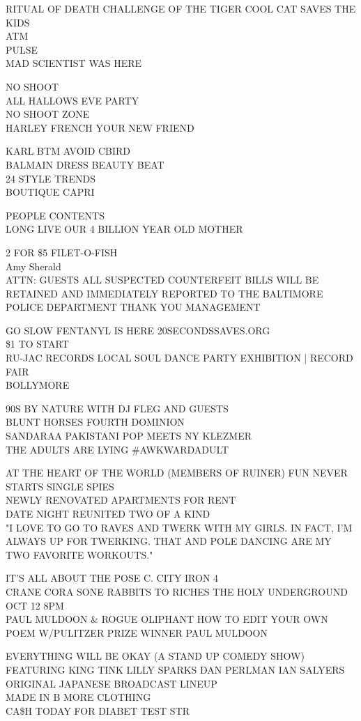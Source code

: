\documentclass[10pt,letterpaper]{article}
\begin{document}
RITUAL OF DEATH CHALLENGE OF THE TIGER COOL CAT SAVES THE KIDS\\
ATM\\
PULSE\\
MAD SCIENTIST WAS HERE

NO SHOOT\\
ALL HALLOWS EVE PARTY\\
NO SHOOT ZONE\\
HARLEY FRENCH YOUR NEW FRIEND

KARL BTM AVOID CBIRD\\
BALMAIN DRESS BEAUTY BEAT\\
24 STYLE TRENDS\\
BOUTIQUE CAPRI

PEOPLE CONTENTS\\
LONG LIVE OUR 4 BILLION YEAR OLD MOTHER

2 FOR \$5 FILET{-}O{-}FISH\\
Amy Sherald\\
ATTN: GUESTS ALL SUSPECTED COUNTERFEIT BILLS WILL BE RETAINED AND IMMEDIATELY REPORTED TO THE BALTIMORE POLICE DEPARTMENT THANK YOU MANAGEMENT

GO SLOW FENTANYL IS HERE 20SECONDSSAVES.ORG\\
\$1 TO START\\
RU{-}JAC RECORDS LOCAL SOUL DANCE PARTY EXHIBITION | RECORD FAIR\\
BOLLYMORE

90S BY NATURE WITH DJ FLEG AND GUESTS\\
BLUNT HORSES FOURTH DOMINION\\
SANDARAA PAKISTANI POP MEETS NY KLEZMER\\
THE ADULTS ARE LYING \#AWKWARDADULT

AT THE HEART OF THE WORLD (MEMBERS OF RUINER) FUN NEVER STARTS SINGLE SPIES\\
NEWLY RENOVATED APARTMENTS FOR RENT\\
DATE NIGHT REUNITED TWO OF A KIND\\
"I LOVE TO GO TO RAVES AND TWERK WITH MY GIRLS.  IN FACT, I'M ALWAYS UP FOR TWERKING.  THAT AND POLE DANCING ARE MY TWO FAVORITE WORKOUTS."

IT'S ALL ABOUT THE POSE C. CITY IRON 4\\
CRANE CORA SONE RABBITS TO RICHES THE HOLY UNDERGROUND OCT 12 8PM\\
PAUL MULDOON \& ROGUE OLIPHANT HOW TO EDIT YOUR OWN POEM W/PULITZER PRIZE WINNER PAUL MULDOON

EVERYTHING WILL BE OKAY (A STAND UP COMEDY SHOW) FEATURING KING TINK LILLY SPARKS DAN PERLMAN IAN SALYERS\\
ORIGINAL JAPANESE BROADCAST LINEUP\\
MADE IN B MORE CLOTHING\\
CA\$H TODAY FOR DIABET TEST STR
\end{document}
